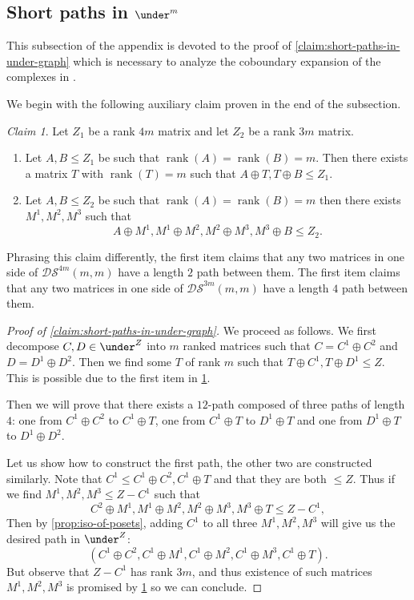\documentclass[10pt,a4paper]{article}
\newcommand{\prettyref}[1]{\cref{#1}}
\theoremstyle{definition}
\theoremstyle{remark}
\newtheorem{claim}[theorem]{Claim}
\DeclareMathOperator{\rank}{rank}
\renewcommand{\leq}{\leqslant}
\numberwithin{equation}{section}
\let\pref=\prettyref
\begin{document}
\subsection[Short paths in the subposet graph]{Short paths in \(\under^m\)} \label{app:short-paths-in-subposet-graph}
This subsection of the appendix is devoted to the proof of \pref{claim:short-paths-in-under-graph} which is necessary to analyze the coboundary expansion of the complexes in \cite{Golowich2023}.

We begin with the following auxiliary claim proven in the end of the subsection.
\begin{claim} \label{claim:connecting-disjoint-matrices-in-under-graph}
    Let \(Z_1\) be a rank \(4m\) matrix and let \(Z_2\) be a rank \(3m\) matrix.
    \begin{enumerate}
        \item Let \(A,B \leq Z_1\) be such that \(\rank(A)=\rank(B)=m\). Then there exists a matrix \(T\) with \(\rank(T)=m\) such that \(A \oplus T, T \oplus B \leq Z_1\).
        \item Let \(A,B \leq Z_2\) be such that \(\rank(A)=\rank(B)=m\) then there exists \(M^1,M^2,M^3\) such that
        \[A \oplus M^1, M^1 \oplus M^2, M^2 \oplus M^3, M^3 \oplus B \leq Z_2.\]
    \end{enumerate}        
\end{claim}
Phrasing this claim differently, the first item claims that any two matrices in one side of \(\mathcal{DS}^{4m}(m,m)\) have a length \(2\) path between them. The first item claims that any two matrices in one side of \(\mathcal{DS}^{3m}(m,m)\) have a length \(4\) path between them.

\begin{proof}[Proof of \pref{claim:short-paths-in-under-graph}]
    We proceed as follows. We first decompose \(C,D \in \under^Z\) into \(m\) ranked matrices such that \(C=C^1 \oplus C^2\) and \(D=D^1 \oplus D^2\). Then we find some \(T\) of rank \(m\) such that \(T \oplus C^1, T \oplus D^1 \leq Z\). This is possible due to the first item in \pref{claim:connecting-disjoint-matrices-in-under-graph}.

    Then we will prove that there exists a \(12\)-path composed of three paths of length \(4\): one from \(C^1\oplus C^2\) to \(C^1 \oplus T\), one from \(C^1 \oplus T\) to \(D^1 \oplus T\) and one from \(D^1 \oplus T\) to \(D^1 \oplus D^2\).

    Let us show how to construct the first path, the other two are constructed similarly. Note that \(C^1 \leq C^1 \oplus C^2, C^1 \oplus T\) and that they are both \(\leq Z\). Thus if we find \(M^1,M^2,M^3 \leq Z-C^1\) such that
    \[C^2 \oplus M^1, M^1 \oplus M^2, M^2 \oplus M^3, M^3 \oplus T \leq Z - C^1,\]
    Then by \pref{prop:iso-of-posets}, adding \(C^1\) to all three \(M^1,M^2,M^3\) will give us the desired path in \(\under^Z\):
    \[(C^1\oplus C^2,C^1\oplus M^1, C^1\oplus M^2, C^1\oplus M^3, C^1\oplus T).\]
    But observe that \(Z-C^1\) has rank \(3m\), and thus existence of such matrices \(M^1,M^2,M^3\) is promised by \pref{claim:connecting-disjoint-matrices-in-under-graph} so we can conclude.
\end{proof}
\end{document}
